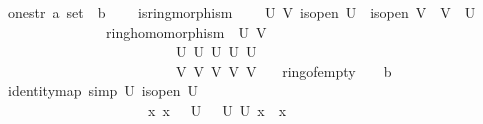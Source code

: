 \documentclass[12pt]{scrartcl}
\begin{document}
\begin{isabelle}
\ \ \ one{\isacharunderscore}{\kern0pt}str{\isacharcolon}{\kern0pt}{\isacharcolon}{\kern0pt}\ {\isachardoublequoteopen}{\isacharprime}{\kern0pt}a\ set\ {\isasymRightarrow}\ {\isacharprime}{\kern0pt}b{\isachardoublequoteclose}\ {\isacharparenleft}{\kern0pt}{\isachardoublequoteopen}{\isasymone}\isactrlbsub {\isacharunderscore}{\kern0pt}\isactrlesub {\isachardoublequoteclose}{\isacharparenright}{\kern0pt}\isanewline
\ \ \ is{\isacharunderscore}{\kern0pt}ring{\isacharunderscore}{\kern0pt}morphism{\isacharcolon}{\kern0pt}\isanewline
\ \ \ \ {\isachardoublequoteopen}{\isasymAnd}U\ V{\isachardot}{\kern0pt}\ is{\isacharunderscore}{\kern0pt}open\ U\ {\isasymLongrightarrow}\ is{\isacharunderscore}{\kern0pt}open\ V\ {\isasymLongrightarrow}\ V\ {\isasymsubseteq}\ U\ \isanewline
\ \ \ \ \ \ \ \ \ \ \ \ \ \ \ \ {\isasymLongrightarrow}\ ring{\isacharunderscore}{\kern0pt}homomorphism\ {\isacharparenleft}{\kern0pt}{\isasymrho}\ U\ V{\isacharparenright}{\kern0pt}\isanewline
\ \ \ \ \ \ \ \ \ \ \ \ \ \ \ \ \ \ \ \ \ \ \ \ \ \ {\isacharparenleft}{\kern0pt}{\isasymFF}\ U{\isacharparenright}{\kern0pt}\ {\isacharparenleft}{\kern0pt}{\isacharplus}{\kern0pt}\isactrlbsub U\isactrlesub {\isacharparenright}{\kern0pt}\ {\isacharparenleft}{\kern0pt}{\isasymcdot}\isactrlbsub U\isactrlesub {\isacharparenright}{\kern0pt}\ {\isasymzero}\isactrlbsub U\isactrlesub \ {\isasymone}\isactrlbsub U\isactrlesub \isanewline
\ \ \ \ \ \ \ \ \ \ \ \ \ \ \ \ \ \ \ \ \ \ \ \ \ \ {\isacharparenleft}{\kern0pt}{\isasymFF}\ V{\isacharparenright}{\kern0pt}\ {\isacharparenleft}{\kern0pt}{\isacharplus}{\kern0pt}\isactrlbsub V\isactrlesub {\isacharparenright}{\kern0pt}\ {\isacharparenleft}{\kern0pt}{\isasymcdot}\isactrlbsub V\isactrlesub {\isacharparenright}{\kern0pt}\ {\isasymzero}\isactrlbsub V\isactrlesub \ {\isasymone}\isactrlbsub V\isactrlesub {\isachardoublequoteclose}\isanewline
\ \ \ ring{\isacharunderscore}{\kern0pt}of{\isacharunderscore}{\kern0pt}empty{\isacharcolon}{\kern0pt}\ {\isachardoublequoteopen}{\isasymFF}\ {\isacharbraceleft}{\kern0pt}{\isacharbraceright}{\kern0pt}\ {\isacharequal}{\kern0pt}\ {\isacharbraceleft}{\kern0pt}b{\isacharbraceright}{\kern0pt}{\isachardoublequoteclose}\isanewline
\ \ \ identity{\isacharunderscore}{\kern0pt}map\ {\isacharbrackleft}{\kern0pt}simp{\isacharbrackright}{\kern0pt}{\isacharcolon}{\kern0pt}\ {\isachardoublequoteopen}{\isasymAnd}U{\isachardot}{\kern0pt}\ is{\isacharunderscore}{\kern0pt}open\ U\ \isanewline
\ \ \ \ \ \ \ \ \ \ \ \ \ \ \ \ \ \ \ \ \ \ {\isasymLongrightarrow}\ {\isacharparenleft}{\kern0pt}{\isasymAnd}x{\isachardot}{\kern0pt}\ x\ {\isasymin}\ {\isasymFF}\ U\ {\isasymLongrightarrow}\ {\isasymrho}\ U\ U\ x\ {\isacharequal}{\kern0pt}\ x{\isacharparenright}{\kern0pt}{\isachardoublequoteclose}\isanewline

\end{isabelle}
\end{document}
